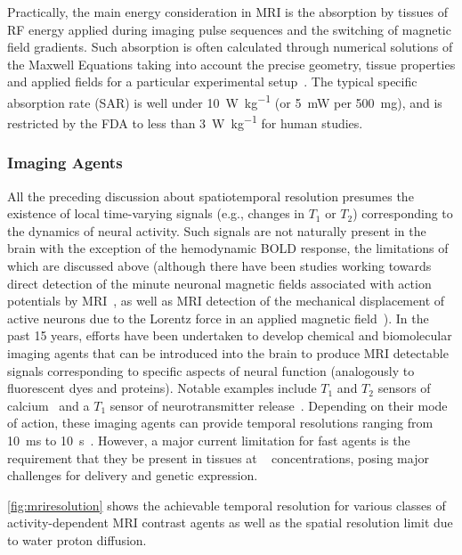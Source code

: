 Practically, the main energy consideration in MRI is the absorption by tissues of RF energy applied during imaging pulse sequences and the switching of magnetic field gradients.
Such absorption is often calculated through numerical solutions of the Maxwell Equations taking into account the precise geometry, tissue properties and applied fields for a particular experimental setup~\cite{collins04}.
The typical specific absorption rate (SAR) is well under \SI{10}{\watt\per\kilogram} (or \SI{5}{\milli\watt} per \SI{500}{\milli\gram}), and is restricted by the FDA to less than \SI{3}{\watt\per\kilogram} for human studies.

\subsubsection{Imaging Agents}

All the preceding discussion about spatiotemporal resolution presumes the existence of local time-varying signals (e.g., changes in $T_1$ or $T_2$) corresponding to the dynamics of neural activity.
Such signals are not naturally present in the brain with the exception of the hemodynamic BOLD response, the limitations of which are discussed above (although there have been studies working towards direct detection of the minute neuronal magnetic fields associated with action potentials by MRI~\cite{Bodurka2002}, as well as MRI detection of the mechanical displacement of active neurons due to the Lorentz force in an applied magnetic field~\cite{roth2009mechanical}).
In the past 15 years, efforts have been undertaken to develop chemical and biomolecular imaging agents that can be introduced into the brain to produce MRI detectable signals corresponding to specific aspects of neural function (analogously to fluorescent dyes and proteins).
Notable examples include $T_1$ and $T_2$ sensors of calcium~\cite{atanasijevic06,li99} and a $T_1$ sensor of neurotransmitter release~\cite{shapiro10}.
Depending on their mode of action, these imaging agents can provide temporal resolutions ranging from \SI{10}{\milli\second} to \SI{10}{\second}~\cite{shapiro06}.
However, a major current limitation for fast agents is the requirement that they be present in tissues at \si{\micro\Molar} concentrations, posing major challenges for delivery and genetic expression.

\autoref{fig:mriresolution} shows the achievable temporal resolution for various classes of activity-dependent MRI contrast agents as well as the spatial resolution limit due to water proton diffusion.

